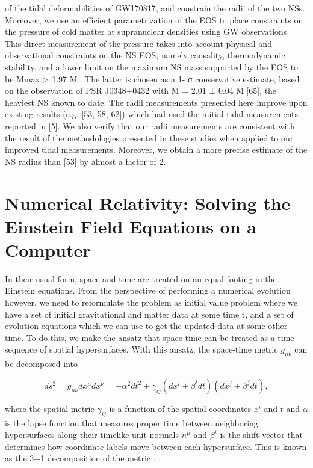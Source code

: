 \documentclass{ut-thesis}
\begin{document}
of the tidal deformabilities of GW170817, and constrain
the radii of the two NSs. Moreover, we use an efficient
parametrization of the EOS to place constraints on the pressure
of cold matter at supranuclear densities using GW observations.
This direct measurement of the pressure takes
into account physical and observational constraints on the
NS EOS, namely causality, thermodynamic stability, and
a lower limit on the maximum NS mass supported by the
EOS to be Mmax > 1.97 M. The latter is chosen as a 1-
σ conservative estimate, based on the observation of PSR
J0348+0432 with M = 2.01 ± 0.04 M[65], the heaviest
NS known to date.
The radii measurements presented here improve upon
existing results (e.g. [53, 58, 62]) which had used the initial
tidal measurements reported in [5]. We also verify that
our radii measurements are consistent with the result of the
methodologies presented in these studies when applied to
our improved tidal measurements. Moreover, we obtain a
more precise estimate of the NS radius than [53] by almost
a factor of 2.



\section{Numerical Relativity: Solving the Einstein Field Equations on a Computer}



In their usual form, space and time are treated on an equal footing in the Einstein equations. From the perspective of performing a numerical evolution however, we need to reformulate the problem as initial value problem where we have a set of initial gravitational and matter data at some time t, and a set of evolution equations which we can use to get the updated data at some other time. To do this, we make the ansatz that space-time can be treated as a time sequence of spatial hypersurfaces. With this ansatz, the space-time metric $g_{\mu\nu}$ can be decomposed into

\begin{equation}
\label{eq:4}
ds^{2} = g_{\mu\nu}dx^{\mu}dx^{\nu} = -\alpha^2dt^2 + \gamma_{ij}(dx^i+\beta^idt)(dx^j+\beta^jdt),
\end{equation}

where the spatial metric $\gamma_{ij}$ is a function of the spatial coordinates $x^{i}$ and $t$ and $\alpha$ is the lapse function that measures proper time between neighboring hypersurfaces along their timelike unit normals $n^{\mu}$ and $\beta^i$ is the shift vector that determines how coordinate labels move between each hypersurface. This is known as the 3+1 decomposition of the metric \cite{arnowitt2008republication}.
\end{document}
